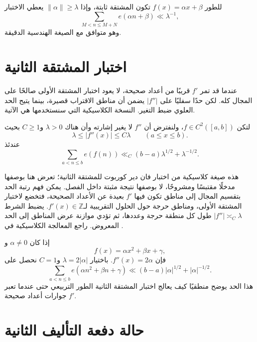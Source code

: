 \begin{example}
للطور \(f(x)=\alpha x+\beta\) تكون المشتقة ثابتة، وإذا \(\|\alpha\|\ge\lambda\) يعطي الاختبار
\[
\sum_{M<n\le M+N}e(\alpha n+\beta)\ll\lambda^{-1},
\]
وهو متوافق مع الصيغة الهندسية الدقيقة.
\end{example}

\section{اختبار المشتقة الثانية}

عندما قد تمر \(f'\) قريبًا من أعداد صحيحة، لا يعود اختبار المشتقة الأولى صالحًا على المجال كله. لكن حدًا سفليًا على \(|f''|\) يضمن أن مناطق الاقتراب قصيرة، بينما يتيح الحد العلوي ضبط التغير. النسخة الكلاسيكية التي سنستخدمها هي الآتية.

\begin{theorem}
\label{thm:second-derivative-test}
لتكن \(f\in C^2([a,b])\)، ولنفترض أن \(f''\) لا يغير إشارته وأن هناك \(\lambda>0\) و\(C\ge1\) بحيث
\[
\lambda\le |f''(x)|\le C\lambda
\qquad(a\le x\le b).
\]
عندئذ
\[
\sum_{a<n\le b}e(f(n))
\ll_C
(b-a)\lambda^{1/2}+\lambda^{-1/2}.
\]
\citedresult
\end{theorem}

هذه صيغة كلاسيكية من اختبار فان دير كوربوت للمشتقة الثانية؛ تعرض هنا بوصفها مدخلًا مقتبسًا ومشروحًا، لا بوصفها نتيجة مثبتة داخل الفصل. يمكن فهم رتبة الحد بتقسيم المجال إلى مناطق تكون فيها \(f'\) بعيدة عن الأعداد الصحيحة، فتخضع لاختبار المشتقة الأولى، ومناطق حرجة حول الحلول التقريبية لـ\(f'(x)\in\mathbb Z\). يضبط الشرط \(|f''|\asymp_C\lambda\) طول كل منطقة حرجة وعددها، ثم تؤدي موازنة عرض المناطق إلى الحد المعروض. راجع المعالجة الكلاسيكية في \cite[الفصل~16]{MontgomeryVaughan2026}.

\begin{example}
إذا كان \(\alpha\ne0\) و
\[
f(x)=\alpha x^2+\beta x+\gamma,
\]
فإن \(f''(x)=2\alpha\). باختيار \(\lambda=2|\alpha|\) و\(C=1\) نحصل على
\[
\sum_{a<n\le b}e(\alpha n^2+\beta n+\gamma)
\ll
(b-a)|\alpha|^{1/2}+|\alpha|^{-1/2}.
\]
هذا الحد يوضح منطقيًا كيف يعالج اختبار المشتقة الثانية الطور التربيعي حتى عندما تعبر \(f'\) جوارات أعداد صحيحة.
\end{example}

\section*{حالة دفعة التأليف الثانية}

